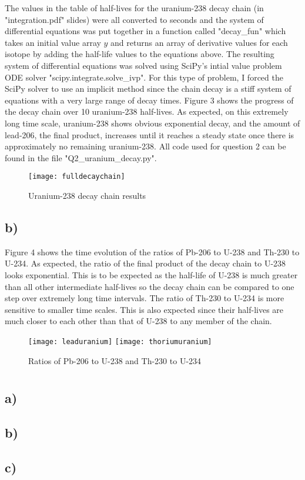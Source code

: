 \documentclass{article}
\newcommand{\<}[1]{\left\langle #1 \right\rangle }
\begin{document}
The values in the table of half-lives for the uranium-238 decay chain (in "integration.pdf" slides) were all converted to seconds and the system of differential equations was put together in a function called "decay\_fun" which takes an initial value array $y$ and returns an array of derivative values for each isotope by adding the half-life values to the equations above. The resulting system of differential equations was solved using SciPy's intial value problem ODE solver "scipy.integrate.solve\_ivp". For this type of problem, I forced the SciPy solver to use an implicit method since the chain decay is a stiff system of equations with a very large range of decay times. Figure 3 shows the progress of the decay chain over 10 uranium-238 half-lives. As expected, on this extremely long time scale, uranium-238 shows obvious exponential decay, and the amount of lead-206, the final product, increases until it reaches a steady state once there is approximately no remaining uranium-238. All code used for question 2 can be found in the file "Q2\_uranium\_decay.py".
\begin{figure}[h]
	\caption{Uranium-238 decay chain results}
	\centering
	\texttt{[image: fulldecaychain]}
\end{figure}

\subsection{b)}
Figure 4 shows the time evolution of the ratios of Pb-206 to U-238 and Th-230 to U-234. As expected, the ratio of the final product of the decay chain to U-238 looks exponential. This is to be expected as the half-life of U-238 is much greater than all other intermediate half-lives so the decay chain can be compared to one step over extremely long time intervals. The ratio of Th-230 to U-234 is more sensitive to smaller time scales. This is also expected since their half-lives are much closer to each other than that of U-238 to any member of the chain.
\begin{figure}[h]
	\caption{Ratios of Pb-206 to U-238 and Th-230 to U-234}
	\centering
	\texttt{[image: leaduranium]}
	\texttt{[image: thoriumuranium]}
\end{figure}

\section{}

\subsection{a)}


\subsection{b)}

\subsection{c)}
\end{document}
